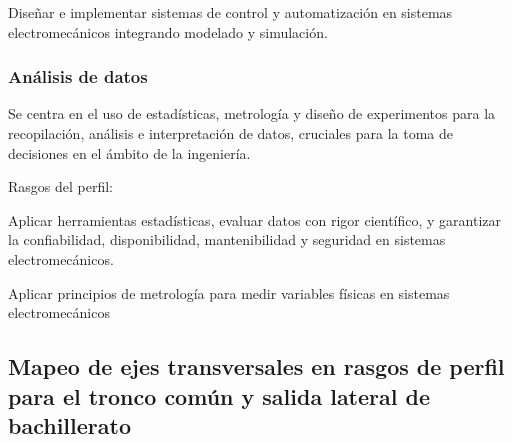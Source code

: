 \begin{cuadroazul}[AUT03]
Diseñar e implementar sistemas de control y automatización en sistemas electromecánicos integrando modelado y simulación.
\end{cuadroazul}

\subsubsection*{Análisis de datos}

Se centra en el uso de estadísticas, metrología y diseño de experimentos para la recopilación, análisis e interpretación de datos, cruciales para la toma de decisiones en el ámbito de la ingeniería.\par

Rasgos del perfil:\par

\begin{cuadroazul}[ADD01]
Aplicar herramientas estadísticas, evaluar datos con rigor científico, y garantizar la confiabilidad, disponibilidad, mantenibilidad y seguridad en sistemas electromecánicos.
\end{cuadroazul}

\begin{cuadroazul}[ADD02]
Aplicar principios de metrología para medir variables físicas en sistemas electromecánicos
\end{cuadroazul}

\subsection*{Mapeo de ejes transversales en rasgos de perfil para el tronco común y salida lateral de bachillerato}

